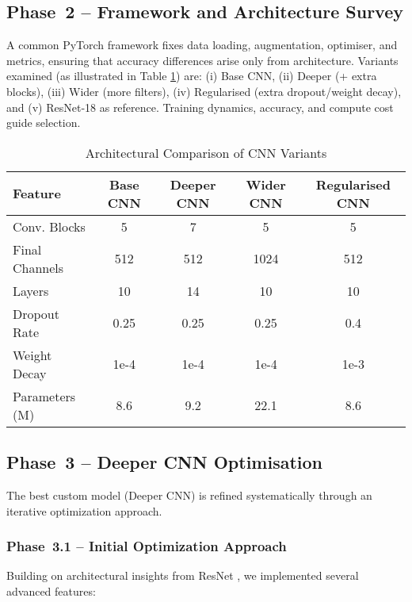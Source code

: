 \subsection{Phase~2 – Framework and Architecture Survey}
\noindent
A common PyTorch framework fixes data loading, augmentation, optimiser, and metrics, ensuring that accuracy differences arise only from architecture. Variants examined (as illustrated in Table \ref{tab:cnn_variants}) are:  
(i) Base CNN, (ii) Deeper (+ extra blocks), (iii) Wider (more filters), (iv) Regularised (extra dropout/\!weight decay), and (v) ResNet‑18 as reference. Training dynamics, accuracy, and compute cost guide selection.

\begin{table}[htbp]
\caption{Architectural Comparison of CNN Variants}
\label{tab:cnn_variants}
\centering
\begin{tabular}{lcccc}
\toprule
\textbf{Feature} & \textbf{Base CNN} & \textbf{Deeper CNN} & \textbf{Wider CNN} & \textbf{Regularised CNN} \\
\midrule
Conv. Blocks & 5 & 7 & 5 & 5 \\
Final Channels & 512 & 512 & 1024 & 512 \\
Layers & 10 & 14 & 10 & 10 \\
Dropout Rate & 0.25 & 0.25 & 0.25 & 0.4 \\
Weight Decay & 1e-4 & 1e-4 & 1e-4 & 1e-3 \\
Parameters (M) & 8.6 & 9.2 & 22.1 & 8.6 \\
\bottomrule
\end{tabular}
\end{table}

\subsection{Phase~3 – Deeper CNN Optimisation}
\noindent
The best custom model (Deeper CNN) is refined systematically through an iterative optimization approach.

\subsubsection{Phase~3.1 – Initial Optimization Approach}
\noindent
Building on architectural insights from ResNet \cite{he2016deep}, we implemented several advanced features:

